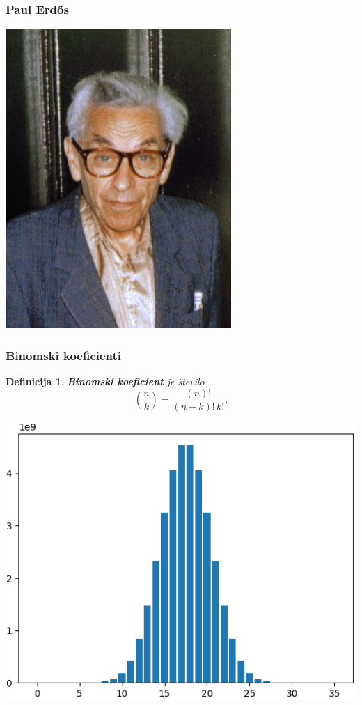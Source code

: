 \documentclass{beamer}
\newtheorem{definicija}{Definicija}
\begin{document}

\begin{frame}
    \frametitle{Paul Erd\H{o}s}
    \centering
    \includegraphics[height=0.8\textheight]{erdos.jpg}
\end{frame}


\begin{frame}
    \frametitle{Binomski koeficienti}
    \begin{definicija}
        \textbf{Binomski koeficient} je število $$\binom{n}{k} = \frac{(n)!}{(n - k)!\,k!}.$$
    \end{definicija}
    \pause
    \centering
    \includegraphics[height=0.5\textheight]{binomial.png}
\end{frame}
\end{document}

